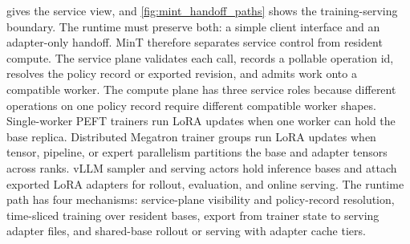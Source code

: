 \documentclass{llmxive}
\begin{document}
 gives the service view, and \cref{fig:mint_handoff_paths} shows the training-serving boundary. The runtime must preserve both: a simple client interface and an adapter-only handoff. MinT therefore separates service control from resident compute. The service plane validates each call, records a pollable operation id, resolves the policy record or exported revision, and admits work onto a compatible worker. The compute plane has three service roles because different operations on one policy record require different compatible worker shapes. Single-worker PEFT trainers run LoRA updates when one worker can hold the base replica. Distributed Megatron trainer groups run LoRA updates when tensor, pipeline, or expert parallelism partitions the base and adapter tensors across ranks. vLLM sampler and serving actors hold inference bases and attach exported LoRA adapters for rollout, evaluation, and online serving. The runtime path has four mechanisms: service-plane visibility and policy-record resolution, time-sliced training over resident bases, export from trainer state to serving adapter files, and shared-base rollout or serving with adapter cache tiers.
\end{document}

